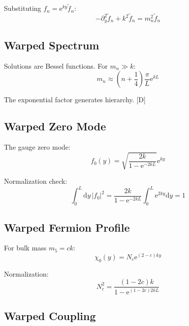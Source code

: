 \documentclass[11pt,a4paper]{article}
\newcommand{\dd}{\mathrm{d}}
\newcommand{\ee}{\mathrm{e}}
\begin{document}
Substituting $f_n = \ee^{ky} \tilde{f}_n$:
\begin{equation}
-\partial_y^2 \tilde{f}_n + k^2 \tilde{f}_n = m_n^2 \tilde{f}_n
\label{eq:warped-shifted}
\end{equation}

\subsection{Warped Spectrum}

Solutions are Bessel functions. For $m_n \gg k$:
\begin{equation}
m_n \approx \left(n + \frac{1}{4}\right)\frac{\pi}{L} \ee^{kL}
\label{eq:warped-spectrum}
\end{equation}

The exponential factor generates hierarchy. [D]

\subsection{Warped Zero Mode}

The gauge zero mode:
\begin{equation}
f_0(y) = \sqrt{\frac{2k}{1 - \ee^{-2kL}}} \ee^{ky}
\label{eq:warped-zero-mode}
\end{equation}

Normalization check:
\begin{equation}
\int_0^L \dd y\, |f_0|^2 = \frac{2k}{1 - \ee^{-2kL}} \int_0^L \ee^{2ky} \dd y = 1
\label{eq:warped-norm-check}
\end{equation}

\subsection{Warped Fermion Profile}

For bulk mass $m_5 = ck$:
\begin{equation}
\chi_0(y) = N_c \ee^{(2-c)ky}
\label{eq:warped-fermion}
\end{equation}

Normalization:
\begin{equation}
N_c^2 = \frac{(1-2c)k}{1 - \ee^{(1-2c)2kL}}
\label{eq:warped-fermion-norm}
\end{equation}

\subsection{Warped Coupling}
\end{document}
